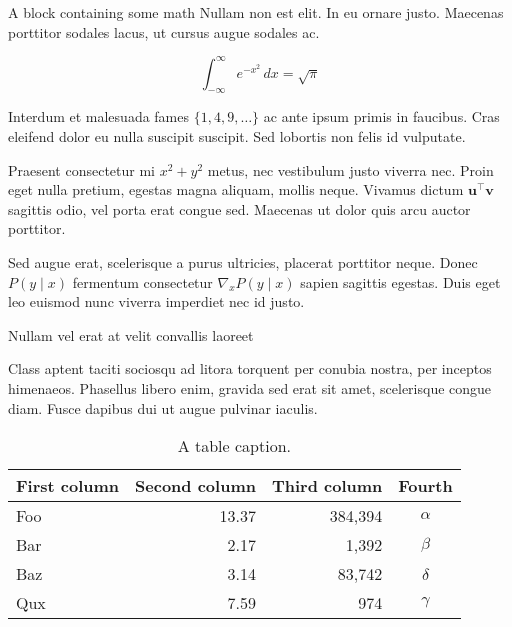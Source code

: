 \documentclass[final, xcolor={svgnames}]{beamer}
\newlength{\colwidth}
\begin{document}
\begin{frame}[t]
\begin{columns}[t]
\begin{column}{\colwidth}
\begin{block}{A block containing some math}
    Nullam non est elit. In eu ornare justo. Maecenas porttitor sodales lacus,
    ut cursus augue sodales ac.

    $$
    \int_{-\infty}^{\infty} e^{-x^2}\,dx = \sqrt{\pi}
    $$

    Interdum et malesuada fames $\{1, 4, 9, \ldots\}$ ac ante ipsum primis in
    faucibus. Cras eleifend dolor eu nulla suscipit suscipit. Sed lobortis non
    felis id vulputate.


    Praesent consectetur mi $x^2 + y^2$ metus, nec vestibulum justo viverra
    nec. Proin eget nulla pretium, egestas magna aliquam, mollis neque. Vivamus
    dictum $\mathbf{u}^\intercal\mathbf{v}$ sagittis odio, vel porta erat
    congue sed. Maecenas ut dolor quis arcu auctor porttitor.


    Sed augue erat, scelerisque a purus ultricies, placerat porttitor neque.
    Donec $P(y \mid x)$ fermentum consectetur $\nabla_x P(y \mid x)$ sapien
    sagittis egestas. Duis eget leo euismod nunc viverra imperdiet nec id
    justo.

  \end{block}

  \begin{block}{Nullam vel erat at velit convallis laoreet}

    Class aptent taciti sociosqu ad litora torquent per conubia nostra, per
    inceptos himenaeos. Phasellus libero enim, gravida sed erat sit amet,
    scelerisque congue diam. Fusce dapibus dui ut augue pulvinar iaculis.

    \begin{table}
      \centering
      \begin{tabular}{l r r c}
        \toprule
        \textbf{First column} & \textbf{Second column} & \textbf{Third column} & \textbf{Fourth} \\
        \midrule
        Foo & 13.37 & 384,394 & $\alpha$ \\
        Bar & 2.17 & 1,392 & $\beta$ \\
        Baz & 3.14 & 83,742 & $\delta$ \\
        Qux & 7.59 & 974 & $\gamma$ \\
        \bottomrule
      \end{tabular}
      \caption{A table caption.}
    \end{table}


\end{block}
\end{column}
\end{columns}
\end{frame}
\end{document}
